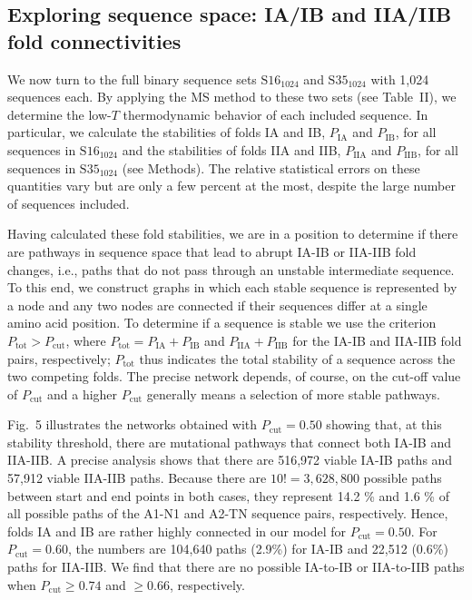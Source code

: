 \documentclass[
aip,
rsi,%
amsmath,amssymb,
reprint,%
]{revtex4-1}
\newcommand {\Pcut}     	{{P_\mathrm{cut}}}
\newcommand {\Ptot}	{{P_\mathrm{tot}}}
\newcommand {\PIA}    	{{P_\mathrm{IA}}}
\newcommand {\PIB}    	{{P_\mathrm{IB}}}
\newcommand {\PIIA}    	{{P_\mathrm{IIA}}}
\newcommand {\PIIB}    	{{P_\mathrm{IIB}}}
\newcommand {\SI}		{${\mathrm{S16}_{1024}}$}
\newcommand {\SII}		{${\mathrm{S35}_{1024}}$}
\begin{document}
\subsection{Exploring sequence space: IA/IB and IIA/IIB fold connectivities}
\noindent
We now turn to the full binary sequence sets {\SI} and {\SII} with 1,024 sequences each. By applying the MS method to these two sets (see Table~II), we determine the low-$T$ thermodynamic behavior of each included sequence. In particular, we calculate the stabilities of folds IA and IB, $\PIA$ and $\PIB$, for all sequences in {\SI} and the stabilities of folds IIA and IIB, $\PIIA$ and $\PIIB$, for all sequences in {\SII} (see Methods). The relative statistical errors on these quantities vary but are only a few percent at the most, despite the large number of sequences included.  

Having calculated these fold stabilities, we are in a position to determine if there are pathways in sequence space that lead to abrupt IA-IB or IIA-IIB fold changes, i.e., paths that do not pass through an unstable intermediate sequence. To this end, we construct graphs in which each stable sequence is represented by a node and any two nodes are connected if their sequences differ at a single amino acid position. To determine if a sequence is stable we use the criterion $P_\mathrm{tot}>\Pcut$, where  $\Ptot = \PIA + \PIB$ and $\PIIA + \PIIB$ for the IA-IB and IIA-IIB fold pairs, respectively; $\Ptot$ thus indicates the total stability of a sequence across the two competing folds. The precise network depends, of course, on the cut-off value of $\Pcut$ and a higher $\Pcut$ generally means a selection of more stable pathways. 

Fig.~5 illustrates the networks obtained with $\Pcut=0.50$ showing that, at this stability threshold, there are mutational pathways that connect both IA-IB and IIA-IIB. A precise analysis shows that there are 516,972 viable IA-IB paths and 57,912 viable IIA-IIB paths. Because there are $10! =3,628,800$ possible paths between start and end points in both cases, they represent 14.2 \% and 1.6 \% of all possible paths of the A1-N1 and A2-TN sequence pairs, respectively. Hence, folds IA and IB are rather highly connected in our model for $\Pcut= 0.50$. For $\Pcut=0.60$, the numbers are 104,640 paths (2.9\%) for IA-IB and 22,512 (0.6\%) paths for IIA-IIB. We find that there are no possible IA-to-IB or IIA-to-IIB paths when $\Pcut\ge0.74$ and $\ge 0.66$, respectively. \\
\end{document}
